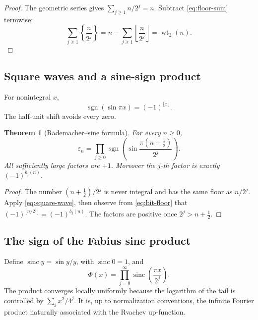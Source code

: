 \documentclass[11pt,oneside]{article}
\numberwithin{equation}{section}
\newtheorem{theorem}{Theorem}[section]
\theoremstyle{definition}
\theoremstyle{remark}
\newcommand{\sgn}{\operatorname{sgn}}
\newcommand{\sinc}{\operatorname{sinc}}
\newcommand{\wt}{\operatorname{wt}_2}
\newcommand{\eps}{\varepsilon}
\begin{document}
\begin{proof}
The geometric series gives \(\sum_{j\ge1}n/2^j=n\).  Subtract
\eqref{eq:floor-sum} termwise:
\[
 \sum_{j\ge1}\left\{\frac n{2^j}\right\}
 =n-\sum_{j\ge1}\left\lfloor\frac n{2^j}\right\rfloor
 =\wt(n).
\]
\end{proof}

\subsection{Square waves and a sine-sign product}

For nonintegral \(x\),
\begin{equation}
  \sgn(\sin\pi x)=(-1)^{\lfloor x\rfloor}.
  \label{eq:square-wave}
\end{equation}
The half-unit shift avoids every zero.

\begin{theorem}[Rademacher--sine formula]
\label{thm:sine-sign}
For every \(n\ge0\),
\begin{equation}
  \boxed{
  \eps_n=\prod_{j\ge0}
  \sgn\!\left(
    \sin\frac{\pi(n+\tfrac12)}{2^j}
  \right).}
  \label{eq:sine-sign}
\end{equation}
All sufficiently large factors are \(+1\).  Moreover the \(j\)-th factor is
exactly \((-1)^{b_j(n)}\).
\end{theorem}

\begin{proof}
The number \((n+\tfrac12)/2^j\) is never integral and has the same floor as
\(n/2^j\).  Apply \eqref{eq:square-wave}, then observe from
\eqref{eq:bit-floor} that
\((-1)^{\lfloor n/2^j\rfloor}=(-1)^{b_j(n)}\).  The factors are positive once
\(2^j>n+\tfrac12\).
\end{proof}

\subsection{The sign of the Fabius sinc product}
\label{sec:sinc-sign}

Define \(\sinc y=\sin y/y\), with \(\sinc0=1\), and
\begin{equation}
  \Phi(x)=\prod_{j=0}^{\infty}
    \sinc\!\left(\frac{\pi x}{2^j}\right).
  \label{eq:sinc-product}
\end{equation}
The product converges locally uniformly because the logarithm of the tail is
controlled by \(\sum_jx^2/4^j\).  It is, up to normalization conventions, the
infinite Fourier product naturally associated with the Rvachev up-function.
\end{document}
